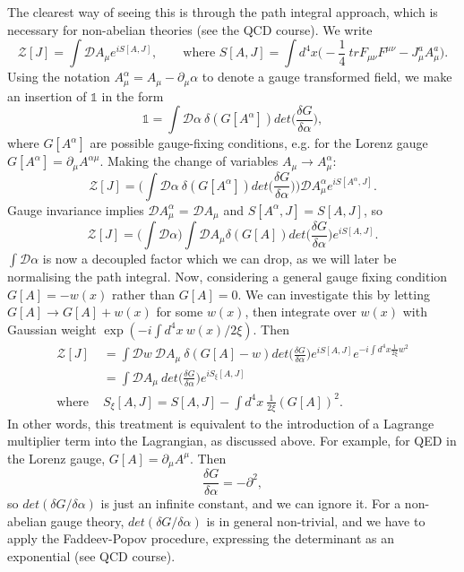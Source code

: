 The clearest way of seeing this is through the path integral approach, which is necessary for non-abelian theories (see the QCD course). We write 
\begin{equation}
\mathcal{Z}[J] = \int\mathcal{D} A_\mu e^{iS[A,J]}, \qquad \text{where } S[A,J] = \int d^4x \bigg(-\frac{1}{4}\ tr F_{\mu \nu}F^{\mu \nu} - J_\mu^a A_\mu^a \bigg).
\end{equation}
Using the notation $A_\mu^\alpha = A_\mu - \partial_\mu \alpha$ to denote a gauge transformed field, we make an insertion of $\mathds{1}$ in the form
\begin{equation}
\mathds{1} = \int \mathcal{D}\alpha\ \delta ( G[A^\alpha]) det\bigg(\frac{\delta G}{\delta \alpha} \bigg),
\end{equation}
where $G[A^\alpha]$ are possible gauge-fixing conditions, e.g. for the Lorenz gauge $G[A^\alpha] = \partial_\mu A^{\alpha \mu}$. Making the change of variables $A_\mu \to A_\mu^\alpha$:
\begin{equation}
\mathcal{Z}[J] = \bigg( \int \mathcal{D}\alpha\ \delta ( G[A^\alpha]) det\bigg(\frac{\delta G}{\delta \alpha} \bigg)\bigg) \mathcal{D}A^\alpha_\mu e^{i S[A^\alpha,J]}.
\end{equation}
Gauge invariance implies $\mathcal{D}A_\mu^\alpha$ = $\mathcal{D}A_\mu$ and $S[A^\alpha, J] = S[A,J]$, so
\begin{equation}
\mathcal{Z}[J] = \bigg( \int \mathcal{D} \alpha \bigg) \int \mathcal{D} A_\mu \delta(G[A]) det \bigg(\frac{\delta G}{\delta \alpha} \bigg) e^{iS[A,J]}.
\end{equation}
$\int \mathcal{D} \alpha$ is now a decoupled factor which we can drop, as we will later be normalising the path integral. Now, considering a general gauge fixing condition $G[A] = -w(x)$ rather than $G[A] = 0$. We can investigate this by letting $G[A] \to G[A] + w(x)$ for some $w(x)$, then integrate over $w(x)$ with Gaussian weight $\exp(-i\int d^4x \ w(x)/2\xi)$. Then
\begin{equation}
\begin{split}
\mathcal{Z}[J] &= \int \mathcal{D} w\ \mathcal{D} A_\mu \ \delta(G[A] - w) det \bigg(\frac{\delta G}{\delta \alpha}\bigg) e^{i S [A,J]} e^{-i \int d^4x \frac{1}{2\xi}w^2} \\
&= \int \mathcal{D} A_\mu\ det\bigg(\frac{\delta G}{\delta \alpha}\bigg) e^{iS_\xi [A,J]} \\
\text{where } &S_\xi[A,J] = S[A,J] - \int d^4x\ \frac{1}{2\xi} (G[A])^2.
\end{split}
\end{equation}
In other words, this treatment is equivalent to the introduction of a Lagrange multiplier term into the Lagrangian, as discussed above.
For example, for QED in the Lorenz gauge, $G[A] = \partial_\mu A^\mu$. Then 
\begin{equation}
\frac{\delta G}{\delta \alpha} = -\partial^2,
\end{equation}
so $det(\delta G/\delta \alpha)$ is just an infinite constant, and we can ignore it. For a non-abelian gauge theory, $det(\delta G/\delta \alpha)$ is in general non-trivial, and we have to apply the Faddeev-Popov procedure, expressing the determinant as an exponential (see QCD course).

